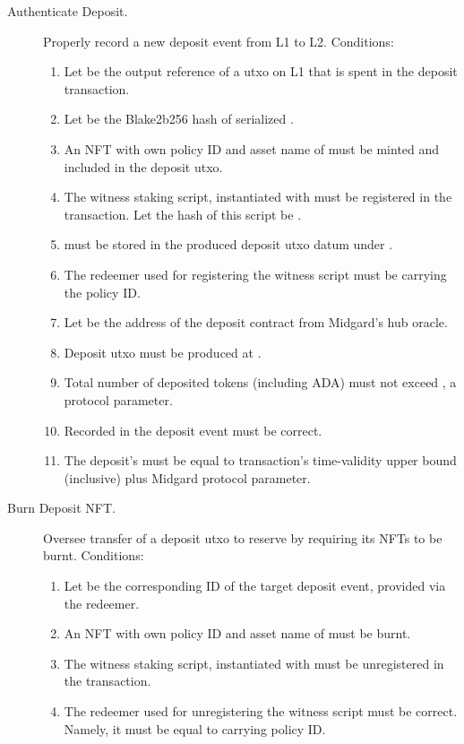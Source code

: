 \documentclass[../midgard.tex]{subfiles}
\begin{document}
\begin{description}
  \item[Authenticate Deposit.] Properly record a new deposit event from L1 to L2.
    Conditions:
      \begin{enumerate}
        \item Let  be the output reference of a utxo on L1 that is spent in the deposit transaction.
        \item Let  be the Blake2b256 hash of serialized .
        \item An NFT with own policy ID and asset name of  must be minted and included in the deposit utxo.
        \item The witness staking script, instantiated with  must be registered in the transaction.
          Let the hash of this script be .
        \item {} must be stored in the produced deposit utxo datum under .
        \item The redeemer used for registering the witness script must be  carrying the  policy ID.
        \item Let  be the address of the deposit contract from Midgard's hub oracle.
        \item Deposit utxo must be produced at .
        \item Total number of deposited tokens (including ADA) must not exceed , a protocol parameter.
        \item Recorded  in the deposit event must be correct.
        \item The deposit's  must be equal to transaction's time-validity upper bound (inclusive) plus  Midgard protocol parameter.
      \end{enumerate}
    \item[Burn Deposit NFT.] Oversee transfer of a deposit utxo to reserve by requiring its NFTs to be burnt.
    Conditions:
      \begin{enumerate}
        \item Let  be the corresponding ID of the target deposit event, provided via the redeemer.
        \item An NFT with own policy ID and asset name of  must be burnt.
        \item The witness staking script, instantiated with  must be unregistered in the transaction.
        \item The redeemer used for unregistering the witness script must be correct.
          Namely, it must be equal to  carrying  policy ID.
      \end{enumerate}
\end{description}
\end{document}
